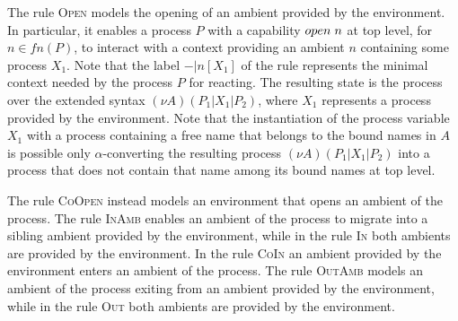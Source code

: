 \documentclass[copyright,creativecommons]{eptcs}
\newcommand{\<}{\langle}
\renewcommand{\>}{\rangle}
\begin{document}
The rule \textsc{Open} models the opening of an ambient provided by
the environment. In particular, it enables a process $P$ with a
capability $open \hspace{1mm} n$ at top level, for $n \in fn(P)$, to
interact with a context providing an ambient $n$ containing some
process $X_1$. Note that the label $-|n[X_1]$ of the rule represents
the minimal context needed by the process $P$
for reacting.  The resulting state is the process over the extended
syntax $(\nu A)(P_1|X_1|P_2)$, where $X_1$ represents a process
provided by the environment.  Note that the instantiation of the
process variable $X_1$ with a process containing a free name that
belongs to the bound names in $A$ is possible only $\alpha$-converting
the resulting process $(\nu A)(P_1|X_1|P_2)$ into a process that does
not contain that name among its bound names at top level.

The rule \textsc{CoOpen} instead models an environment that opens an
ambient of the process.  The rule \textsc{InAmb} enables an ambient of
the process to migrate into a sibling ambient provided by the
environment, while in the rule \textsc{In} both ambients are provided
by the environment. In the rule \textsc{CoIn} an ambient provided by
the environment enters an ambient of the process. The rule
\textsc{OutAmb} models an ambient of the process exiting from an
ambient provided by the environment, while in the rule \textsc{Out}
both ambients are provided by the environment.
\end{document}
